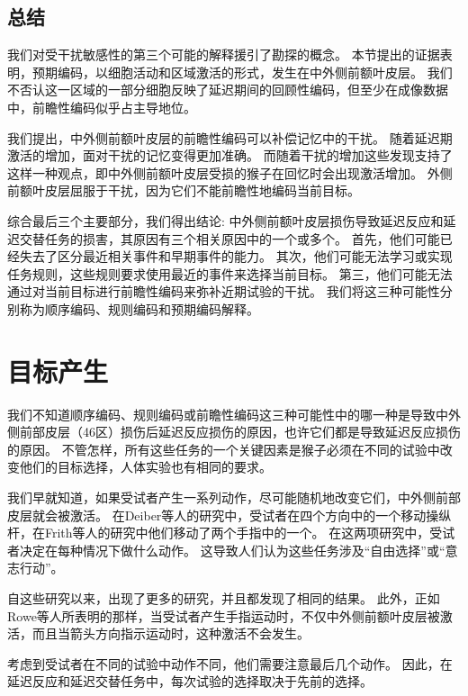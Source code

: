 \subsection{总结}

我们对受干扰敏感性的第三个可能的解释援引了勘探的概念。
本节提出的证据表明，预期编码，以细胞活动和区域激活的形式，发生在中外侧前额叶皮层。
我们不否认这一区域的一部分细胞反映了延迟期间的回顾性编码，但至少在成像数据中，前瞻性编码似乎占主导地位。


我们提出，中外侧前额叶皮层的前瞻性编码可以补偿记忆中的干扰。
随着延迟期激活的增加，面对干扰的记忆变得更加准确。
而随着干扰的增加这些发现支持了这样一种观点，即中外侧前额叶皮层受损的猴子在回忆时会出现激活增加。
外侧前额叶皮层屈服于干扰，因为它们不能前瞻性地编码当前目标。


综合最后三个主要部分，我们得出结论: 中外侧前额叶皮层损伤导致延迟反应和延迟交替任务的损害，其原因有三个相关原因中的一个或多个。
首先，他们可能已经失去了区分最近相关事件和早期事件的能力。
其次，他们可能无法学习或实现任务规则，这些规则要求使用最近的事件来选择当前目标。
第三，他们可能无法通过对当前目标进行前瞻性编码来弥补近期试验的干扰。
我们将这三种可能性分别称为顺序编码、规则编码和预期编码解释。



\section{目标产生}

我们不知道顺序编码、规则编码或前瞻性编码这三种可能性中的哪一种是导致中外侧前部皮层（46区）损伤后延迟反应损伤的原因，也许它们都是导致延迟反应损伤的原因。
不管怎样，所有这些任务的一个关键因素是猴子必须在不同的试验中改变他们的目标选择，人体实验也有相同的要求。


我们早就知道，如果受试者产生一系列动作，尽可能随机地改变它们，中外侧前部皮层就会被激活。
在Deiber等人的研究中\cite{deiber1991cortical}，受试者在四个方向中的一个移动操纵杆，在Frith等人的研究中\cite{frith1991willed}他们移动了两个手指中的一个。
在这两项研究中，受试者决定在每种情况下做什么动作。
这导致人们认为这些任务涉及“自由选择”\cite{playford1992impaired}或“意志行动”\cite{frith1991willed}。


自这些研究以来，出现了更多的研究，并且都发现了相同的结果\cite{frith2000role}。
此外，正如Rowe等人\cite{rowe2005prefrontal}所表明的那样，当受试者产生手指运动时，不仅中外侧前额叶皮层被激活，而且当箭头方向指示运动时，这种激活不会发生。


考虑到受试者在不同的试验中动作不同，他们需要注意最后几个动作。
因此，在延迟反应和延迟交替任务中，每次试验的选择取决于先前的选择。



